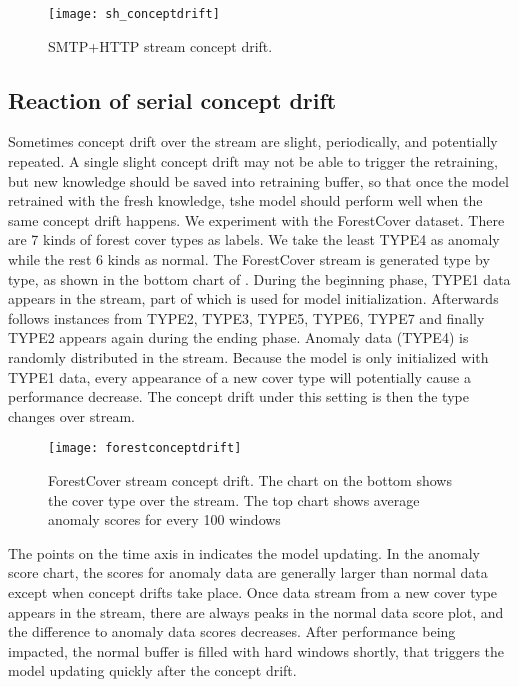 \begin{figure}[h]
\centering
\texttt{[image: sh\_conceptdrift]}
\caption[SMTP+HTTP stream concept drift]{SMTP+HTTP stream concept drift.}
\label{fig:smtp+http}
\end{figure}

\subsection{Reaction of serial concept drift}
\label{sec:reaction}

Sometimes concept drift over the stream are slight, periodically, and potentially repeated. A single slight concept drift may not be able to trigger the retraining, but new knowledge should be saved into retraining buffer, so that once the model retrained with the fresh knowledge, tshe model should perform well when the same concept drift happens. We experiment with the ForestCover dataset. There are 7 kinds of forest cover types as labels. We take the least TYPE4 as anomaly while the rest 6 kinds as normal. The ForestCover stream is generated type by type, as shown in the bottom chart of . During the beginning phase, TYPE1 data appears in the stream, part of which is used for model initialization. Afterwards follows instances from TYPE2, TYPE3, TYPE5, TYPE6, TYPE7 and finally TYPE2 appears again during the ending phase. Anomaly data (TYPE4) is randomly distributed in the stream. Because the model is only initialized with TYPE1 data, every appearance of a new cover type will potentially cause a performance decrease. The concept drift under this setting is then the type changes over stream. \\

\begin{figure}[h]
\centering
\texttt{[image: forestconceptdrift]}
\caption[ForestCover stream concept drift]{ ForestCover stream concept drift. The chart on the bottom shows the cover type over the stream. The top chart shows average anomaly scores for every 100 windows}
\label{fig:fcd}
\end{figure}

 The points on the time axis in  indicates the model updating. In the anomaly score chart, the scores for anomaly data are generally larger than normal data except when concept drifts take place. Once data stream from a new cover type appears in the stream, there are always peaks in the normal data score plot, and the difference to anomaly data scores decreases. After performance being impacted, the normal buffer is filled with hard windows shortly, that triggers the model updating quickly after the concept drift. \\

